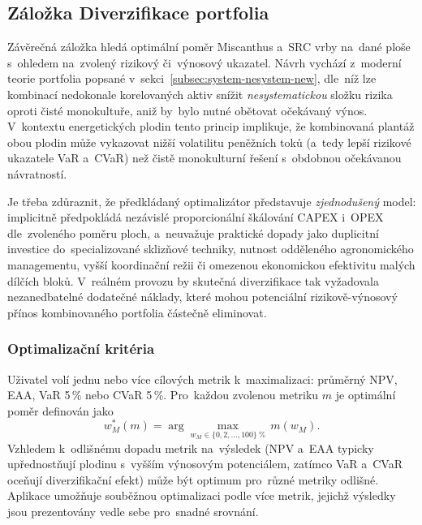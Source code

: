 \subsection{Záložka Diverzifikace portfolia}
\label{sec:diverzifikace}

Závěrečná záložka hledá optimální poměr Miscanthus a~SRC vrby na~dané
ploše s~ohledem na~zvolený rizikový či~výnosový ukazatel. Návrh vychází
z~moderní teorie portfolia popsané v~sekci~\ref{subsec:system-nesystem-new}, dle~níž lze kombinací
nedokonale korelovaných aktiv snížit \textit{nesystematickou} složku
rizika oproti čisté monokultuře, aniž by~bylo nutné obětovat očekávaný
výnos. V~kontextu energetických plodin tento princip implikuje, že
kombinovaná plantáž obou plodin může vykazovat nižší volatilitu peněžních
toků (a~tedy lepší rizikové ukazatele VaR a~CVaR) než čistě monokulturní
řešení s~obdobnou očekávanou návratností.

Je třeba zdůraznit, že předkládaný optimalizátor představuje
\emph{zjednodušený} model: implicitně předpokládá nezávislé proporcionální
škálování CAPEX i~OPEX dle~zvoleného poměru ploch, a~neuvažuje praktické
dopady jako duplicitní investice do~specializované sklizňové techniky,
nutnost odděleného agronomického managementu, vyšší koordinační režii
či omezenou ekonomickou efektivitu malých dílčích bloků. V~reálném
provozu by skutečná diverzifikace tak vyžadovala nezanedbatelné dodatečné
náklady, které mohou potenciální rizikově-výnosový přínos kombinovaného
portfolia částečně eliminovat. 

\subsubsection{Optimalizační kritéria}
\label{sec:diverzifikace_metriky}

Uživatel volí jednu nebo více cílových metrik k~maximalizaci:
průměrný NPV, EAA, VaR 5\,\% nebo CVaR 5\,\%. Pro~každou zvolenou metriku $m$ je optimální
poměr definován jako
\begin{equation}
    w_M^*(m) = \arg\max_{w_M \in \{0, 2, \ldots, 100\}~\%}\, m\!\left(w_M\right).
    \label{eq:opt_mix}
\end{equation}
Vzhledem k~odlišnému dopadu metrik na~výsledek (NPV a~EAA typicky
upřednostňují plodinu s~vyšším výnosovým potenciálem, zatímco VaR
a~CVaR oceňují diverzifikační efekt) může být optimum pro~různé metriky
odlišné. Aplikace umožňuje souběžnou optimalizaci podle více metrik,
jejichž výsledky jsou prezentovány vedle sebe pro~snadné srovnání.

